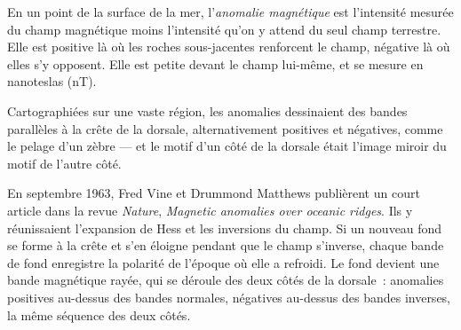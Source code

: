 \begin{definition}\label{def:g11:drift-to-spreading:anomaly}
En un point de la surface de la mer,
l'\emph{anomalie magnétique} est l'intensité mesurée du champ magnétique moins l'intensité
qu'on y attend du seul champ terrestre. Elle est positive là où les roches
sous-jacentes renforcent le champ, négative là où elles s'y opposent. Elle
est petite devant le champ lui-même, et se mesure en nanoteslas
(\unit{nT}).
\end{definition}

Cartographiées sur une vaste région, les anomalies dessinaient des bandes
parallèles à la crête de la dorsale, alternativement positives et
négatives, comme le pelage d'un zèbre --- et le motif d'un côté de la
dorsale était l'image miroir du motif de l'autre côté.

\begin{history}
En septembre 1963, Fred Vine et Drummond Matthews publièrent un court
article dans la revue \emph{Nature}, \emph{Magnetic anomalies over oceanic
ridges}. Ils y réunissaient l'expansion de Hess et les inversions du champ.
Si un nouveau fond se forme à la crête et s'en éloigne pendant que le champ
s'inverse, chaque bande de fond enregistre la polarité de l'époque où elle
a refroidi. Le fond devient une bande magnétique rayée, qui se déroule des
deux côtés de la dorsale~: anomalies positives au-dessus des bandes
normales, négatives au-dessus des bandes inverses, la même séquence des deux
côtés.
\end{history}

